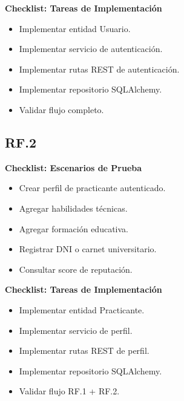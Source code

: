 \documentclass[12pt,a4paper]{article}
\begin{document}
\textbf{Checklist: Tareas de Implementación}

\begin{itemize}
    \item Implementar entidad Usuario.
    \item Implementar servicio de autenticación.
    \item Implementar rutas REST de autenticación.
    \item Implementar repositorio SQLAlchemy.
    \item Validar flujo completo.
\end{itemize}

\subsection{RF.2}

\textbf{Checklist: Escenarios de Prueba}

\begin{itemize}
    \item Crear perfil de practicante autenticado.
    \item Agregar habilidades técnicas.
    \item Agregar formación educativa.
    \item Registrar DNI o carnet universitario.
    \item Consultar score de reputación.
\end{itemize}

\textbf{Checklist: Tareas de Implementación}

\begin{itemize}
    \item Implementar entidad Practicante.
    \item Implementar servicio de perfil.
    \item Implementar rutas REST de perfil.
    \item Implementar repositorio SQLAlchemy.
    \item Validar flujo RF.1 + RF.2.
\end{itemize}
\end{document}
